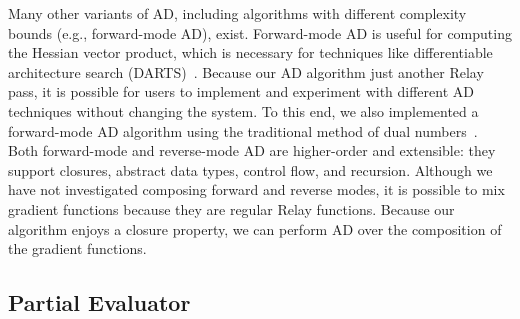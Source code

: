 Many other variants of AD, including algorithms with different
  complexity bounds (e.g., forward-mode AD), exist.
Forward-mode AD is useful for computing the
  Hessian vector product, which is necessary for techniques like differentiable architecture search
  (DARTS)~\citep{darts}.
Because our AD algorithm just another Relay pass,
  it is possible for users to implement and experiment with different
  AD techniques without changing the system.
To this end, we also implemented a  forward-mode AD algorithm using the traditional method of dual
  numbers~\citep{ad_survey}.
Both forward-mode and reverse-mode AD are higher-order and extensible: they
  support closures, abstract data types, control flow, and recursion.
Although we have not investigated
  composing forward and reverse modes,
  it is possible to mix gradient functions
  because they are regular Relay functions.
Because our algorithm enjoys a closure property,
  we can perform AD over the composition of the gradient
  functions.



\subsection{Partial Evaluator}
\label{sec:partial_eval}

